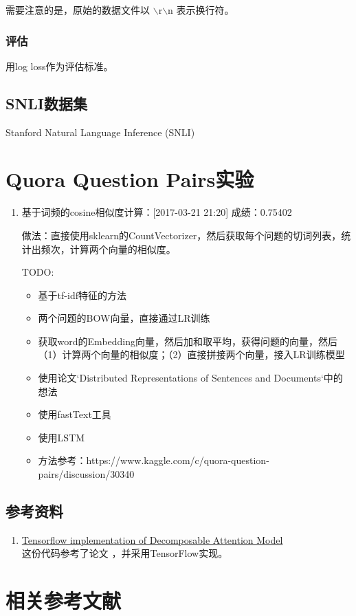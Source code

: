 需要注意的是，原始的数据文件以 $\backslash$r$\backslash$n 表示换行符。

\subsubsection{评估}
用log loss作为评估标准。


\subsection{SNLI数据集}
 Stanford Natural Language Inference (SNLI)


\section{Quora Question Pairs实验}

\begin{enumerate}
\item 基于词频的cosine相似度计算：[2017-03-21 21:20]
成绩：0.75402

做法：直接使用sklearn的CountVectorizer，然后获取每个问题的切词列表，统计出频次，计算两个向量的相似度。

TODO: 
\begin{itemize}
\item 基于tf-idf特征的方法
\item 两个问题的BOW向量，直接通过LR训练
\item 获取word的Embedding向量，然后加和取平均，获得问题的向量，然后（1）计算两个向量的相似度；（2）直接拼接两个向量，接入LR训练模型
\item 使用论文`Distributed Representations of Sentences and Documents`中的想法
\item 使用fastText工具
\item 使用LSTM
\item 方法参考：https://www.kaggle.com/c/quora-question-pairs/discussion/30340
\end{itemize}



\end{enumerate}

\subsection{参考资料}

\begin{enumerate}
    \item \href{https://github.com/siarez/sentence_pair_classifier}{Tensorflow implementation of Decomposable Attention Model} \\
        这份代码参考了论文 \cite{Parikh:2016aa}，并采用TensorFlow实现。

\end{enumerate}


\section{相关参考文献}

\ifx\projectsnotes\undefined
    
\fi
